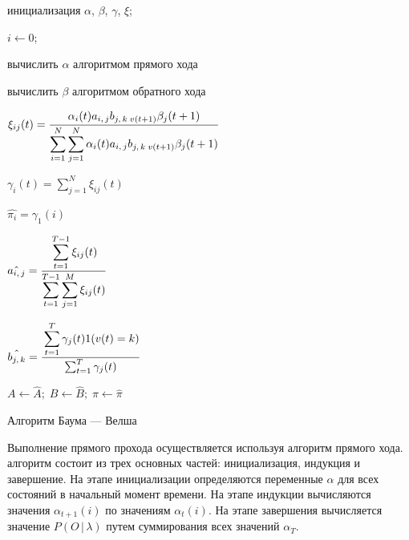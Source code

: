 \begin{algorithm}[H]
	\SetAlgoLined
	
	инициализация $\alpha$, $\beta$, $\gamma$, $\xi$;
	
	$i \leftarrow 0$;
	{
		вычислить $\alpha$ алгоритмом прямого хода\;
		
		вычислить $\beta$ алгоритмом обратного хода\;
		
		$\xi_{ij} (t) = \cfrac{\alpha_i(t) a_{i,\,j} b_{j,\,k\;v(t+1) }\beta_j(t+1)}{\displaystyle\sum_{i=1}^{N} \displaystyle\sum_{j=1}^{N} \alpha_i(t) a_{i,\,j} b_{j,\,k\;v(t+1) }\beta_j(t+1)}$\;
		
		$\gamma_i(t) = \sum_{j=1}^N \xi_{ij}(t)$\;
		
		$\hat{\pi_i} = \gamma_1(i)$\;
		
		$\hat{a_{i,\,j}} = \cfrac{\displaystyle\sum_{t=1}^{T-1} \xi_{ij} (t)}{\displaystyle\sum_{t=1}^{T-1} \displaystyle\sum_{j=1}^{M} \xi_{ij} (t)}$\;
		
		$\hat{b_{j,\,k}} = \cfrac{\displaystyle\sum_{t=1}^T \gamma_j(t) 1(v(t)=k)}{\sum_{t=1}^T \gamma_j(t) }$\;
		
		$A \leftarrow \hat{A};\;B \leftarrow \hat{B};\;\pi \leftarrow \hat{\pi}$\;
		
	} %
	\caption{Алгоритм Баума --- Велша}
	\label{alg:baum-welch}
\end{algorithm}

Выполнение прямого прохода осуществляется используя алгоритм прямого хода. алгоритм состоит из трех основных частей: инициализация, индукция и завершение. На этапе инициализации определяются переменные $\alpha$ для всех состояний в начальный момент времени. На этапе индукции вычисляются значения $\alpha_{t + 1}(i)$ по значениям $\alpha_t(i)$. На этапе завершения вычисляется значение $P(O\,|\,\lambda)$ путем суммирования всех значений $\alpha_T$.

